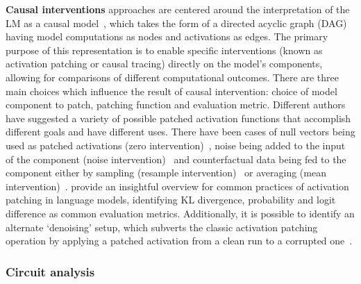 \textbf{Causal interventions} approaches are centered around the interpretation of the LM as a causal model~\cite{geiger2021,mcgrath2023}, which takes the form of a directed acyclic graph (DAG) having model computations as nodes and activations as edges.
The primary purpose of this representation is to enable specific interventions (known as activation patching or causal tracing) directly on the model's components, allowing for comparisons of different computational outcomes.
There are three main choices which influence the result of causal intervention: choice of model component to patch, patching function and evaluation metric.
Different authors have suggested a variety of possible patched activation functions that accomplish different goals and have different uses.
There have been cases of null vectors being used as patched activations (zero intervention)~\cite{olsson2022, mohebbi2023}, noise being added to the input of the component (noise intervention)~\cite{meng2022} and counterfactual data being fed to the component either by sampling (resample intervention)~\cite{hanna2023, conmy2023} or averaging (mean intervention)~\cite{wang2023}.
\citet{zhang2024} provide an insightful overview for common practices of activation patching in language models, identifying KL divergence, probability and logit difference as common evaluation metrics.
Additionally, it is possible to identify an alternate `denoising' setup, which subverts the classic activation patching operation by applying a patched activation from a clean run to a corrupted one~\cite{lieberum2023, meng2022}.


\subsubsection{Circuit analysis}

